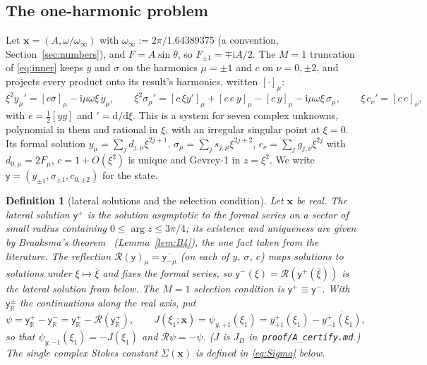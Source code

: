 \documentclass{amsart}
\numberwithin{equation}{section}
\theoremstyle{plain}
\newtheorem{definition}{Definition}[section]
\theoremstyle{definition}
\theoremstyle{remark}
\newcommand{\winf}{\omega_\infty}
\newcommand{\bx}{\mathbf{x}}
\newcommand{\iu}{\mathrm{i}}
\newcommand{\dd}{\mathrm{d}}
\newcommand{\repo}[1]{\texttt{#1}}
\begin{document}
\subsection{The one-harmonic problem}
Let $\bx = (A, \omega/\winf)$ with $\winf := 2\pi/1.64389375$ (a convention, Section~\ref{sec:numbers}), and
$F = A\sin\theta$, so $F_{\pm1} = \mp\iu A/2$. The $M = 1$ truncation of \eqref{eq:inner} keeps $y$ and $\sigma$ on the harmonics
$\mu = \pm1$ and $c$ on $\nu = 0, \pm2$, and projects every product onto its result's harmonics, written $[\cdot]_\mu$:
\begin{equation}\label{eq:M1}
\xi^2 y_\mu' = [c\sigma]_\mu - \iu\mu\omega\xi\,y_\mu,\qquad
\xi^2 \sigma_\mu' = [c\,\xi y']_\mu + [c\,e\,y]_\mu - [c\,y]_\mu - \iu\mu\omega\xi\,\sigma_\mu,\qquad
\xi\,c_\nu' = [c\,e]_\nu,
\end{equation}
with $e = \tfrac12[yy]$ and $' = \dd/\dd\xi$. This is a system for seven complex unknowns, polynomial in them and rational in
$\xi$, with an irregular singular point at $\xi = 0$. Its formal solution
$y_\mu = \sum_j d_{j,\mu}\xi^{2j+1}$, $\sigma_\mu = \sum_j s_{j,\mu}\xi^{2j+2}$, $c_\nu = \sum_j g_{j,\nu}\xi^{2j}$ with $d_{0,\mu} = 2F_\mu$,
$c = 1 + O(\xi^2)$ is unique and Gevrey-1 in $z = \xi^2$. We write $\mathsf y = (y_{\pm1}, \sigma_{\pm1}, c_{0,\pm2})$ for the
state.

\begin{definition}[lateral solutions and the selection condition]\label{def:M1sel}
Let $\bx$ be real. The \emph{lateral solution} $\mathsf y^+$ is the solution asymptotic to the formal series on a sector of small
radius containing $0 \le \arg z \le 3\pi/4$; its existence and uniqueness are given by Braaksma's
theorem~\cite{Braaksma1992} (Lemma~\ref{lem:B4}), \emph{the one fact taken from the literature}. The reflection
$\mathcal R(\mathsf y)_\mu = \overline{\mathsf y_{-\mu}}$ (on each of $y$, $\sigma$, $c$) maps solutions to solutions under
$\xi \mapsto \bar\xi$ and fixes the formal series, so $\mathsf y^-(\xi) = \mathcal R(\mathsf y^+(\bar\xi))$ is the lateral solution
from below. The \emph{$M = 1$ selection condition} is $\mathsf y^+ \equiv \mathsf y^-$. With $\mathsf y^\pm_{\mathbb R}$ the
continuations along the real axis, put
\[
\psi = \mathsf y^+_{\mathbb R} - \mathsf y^-_{\mathbb R} = \mathsf y^+_{\mathbb R} - \mathcal R(\mathsf y^+_{\mathbb R}),\qquad
J(\xi_1; \bx) = \psi_{y,+1}(\xi_1) = y^+_{+1}(\xi_1) - \overline{y^+_{-1}(\xi_1)} ,
\]
so that $\psi_{y,-1}(\xi_1) = -\overline{J(\xi_1)}$ and $\mathcal R\psi = -\psi$. ($J$ is $J_D$ in~\repo{proof/A\_certify.md}.) The
single complex Stokes constant $\Sigma(\bx)$ is defined in \eqref{eq:Sigma} below.
\end{definition}
\end{document}
